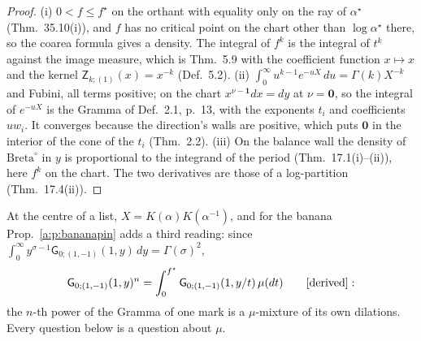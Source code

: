 \documentclass[11pt]{article}
\newcommand{\one}{\mathbf 1}
\newcommand{\sG}{\mathsf G}
\newcommand{\sZ}{\mathsf Z}
\theoremstyle{plain}
\theoremstyle{definition}
\theoremstyle{remark}
\newcommand{\derived}{\textup{[derived]}}
\begin{document}
\begin{proof}
(i) $0<f\le f^\star$ on the orthant with equality only on the ray of $\alpha^\star$ (Thm.~35.10(i)), and $f$ has no critical point on the chart other than $\log\alpha^\star$ there, so the coarea formula gives a density. The integral of $f^k$ is the integral of $t^k$ against the image measure, which is Thm.~5.9 with the coefficient function $x\mapsto x$ and the kernel $\sZ_{k;(1)}(x)=x^{-k}$ (Def.~5.2). (ii) $\int_0^\infty u^{k-1}e^{-uX}\,du=\Gamma(k)X^{-k}$ and Fubini, all terms positive; on the chart $x^{\nu-\one}dx=dy$ at $\nu=\mathbf 0$, so the integral of $e^{-uX}$ is the Gramma of Def.~2.1, p.~13, with the exponents $t_i$ and coefficients $uw_i$. It converges because the direction's walls are positive, which puts $\mathbf 0$ in the interior of the cone of the $t_i$ (Thm.~2.2). (iii) On the balance wall the density of $\mathrm{Breta}^\circ$ in $y$ is proportional to the integrand of the period (Thm.~17.1(i)--(ii)), here $f^k$ on the chart. The two derivatives are those of a log-partition (Thm.~17.4(ii)).
\end{proof}

At the centre of a list, $X=K(\alpha)K(\alpha^{-1})$, and for the banana Prop.~\ref{a:p:bananapin} adds a third reading: since $\int_0^\infty y^{\sigma-1}\sG_{0;(1,-1)}(1,y)\,dy=\Gamma(\sigma)^2$,
\[
\sG_{0;(1,-1)}(1,y)^n=\int_0^{f^\star}\sG_{0;(1,-1)}(1,y/t)\,\mu(dt)\qquad\derived:
\]
the $n$-th power of the Gramma of one mark is a $\mu$-mixture of its own dilations. Every question below is a question about $\mu$.
\end{document}
